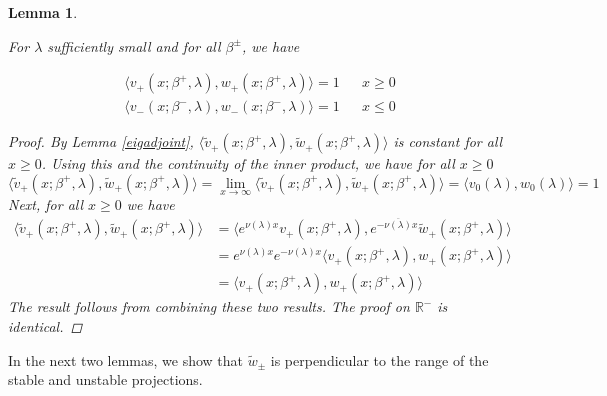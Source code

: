 \documentclass[12pt]{article}
\def\R{{\mathbb R}}
\newtheorem{lemma}{Lemma}
\begin{document}
\begin{lemma}\label{vwIP1}

For $\lambda$ sufficiently small and for all $\beta^\pm$, we have

\begin{align}
\langle v_+(x; \beta^+, \lambda), w_+(x; \beta^+, \lambda) \rangle = 1 && x \geq 0\\
\langle v_-(x; \beta^-, \lambda), w_-(x; \beta^-, \lambda) \rangle = 1 && x \leq 0
\end{align}

\begin{proof}
By Lemma \ref{eigadjoint}, $\langle \tilde{v}_+(x; \beta^+, \lambda), \tilde{w}_+(x; \beta^+, \lambda) \rangle$ is constant for all $x \geq 0$. Using this and the continuity of the inner product, we have for all $x \geq 0$
\begin{equation*}
\langle \tilde{v}_+(x; \beta^+, \lambda), \tilde{w}_+(x; \beta^+, \lambda) \rangle = \lim_{x \rightarrow \infty} \langle \tilde{v}_+(x; \beta^+, \lambda), \tilde{w}_+(x; \beta^+, \lambda) \rangle = \langle v_0(\lambda), w_0(\lambda) \rangle = 1
\end{equation*}
Next, for all $x \geq 0$ we have
\begin{align*}
\langle \tilde{v}_+(x; \beta^+, \lambda), \tilde{w}_+(x; \beta^+, \lambda) \rangle
&= \langle e^{\nu(\lambda) x } v_+(x; \beta^+, \lambda), e^{-\overline{\nu(\lambda)} x} \tilde{w}_+(x; \beta^+, \lambda) \rangle \\
&= e^{\nu(\lambda) x } e^{-\nu(\lambda) x } \langle v_+(x; \beta^+, \lambda), w_+(x; \beta^+, \lambda) \rangle \\
&= \langle v_+(x; \beta^+, \lambda), w_+(x; \beta^+, \lambda) \rangle
\end{align*}
The result follows from combining these two results. The proof on $\R^-$ is identical.
\end{proof}
\end{lemma}

In the next two lemmas, we show that $\tilde{w}_\pm$ is perpendicular to the range of the stable and unstable projections.

\end{document}
